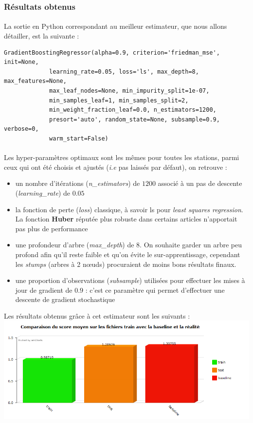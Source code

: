 \documentclass[14pt, openany]{article}
\begin{document}
\subsubsection{Résultats obtenus}
\paragraph{}
La sortie en Python correspondant au meilleur estimateur, que nous allons détailler, est la suivante :
\begin{verbatim}
GradientBoostingRegressor(alpha=0.9, criterion='friedman_mse', init=None,
             learning_rate=0.05, loss='ls', max_depth=8, max_features=None,
             max_leaf_nodes=None, min_impurity_split=1e-07,
             min_samples_leaf=1, min_samples_split=2,
             min_weight_fraction_leaf=0.0, n_estimators=1200,
             presort='auto', random_state=None, subsample=0.9, verbose=0,
             warm_start=False)
\end{verbatim}
\paragraph{}
Les hyper-paramètres optimaux sont les mêmes pour toutes les stations, parmi ceux qui ont été choisis et ajustés (\textit{i.e} pas laissés par défaut), on retrouve :
\begin{itemize}
\item un nombre d'itérations (\textit{n\_estimators}) de $1200$ associé à un pas de descente (\textit{learning\_rate}) de $0.05$
\item la fonction de perte (\textit{loss}) classique, à savoir \og ls \fg{} pour \textit{least squares regression}. La fonction \textbf{Huber} réputée plus robuste dans certains articles n'apportait pas plus de performance
\item une profondeur d'arbre (\textit{max\_depth}) de 8. On souhaite garder un arbre peu profond afin qu'il reste faible et qu'on évite le sur-apprentissage, cependant les \textit{stumps} (arbres à 2 nœuds) procuraient de moins bons résultats finaux.
\item une proportion d'observations (\textit{subsample}) utilisées pour effectuer les mises à jour de gradient de $0.9$ : c'est ce paramètre qui permet d'effectuer une descente de gradient stochastique
\end{itemize}
Les résultats obtenus grâce à cet estimateur sont les suivants :\\
\includegraphics[scale=0.8]{Images/score_boosting.png}
\begin{center}
\label{fig1}
\end{center}
\end{document}
